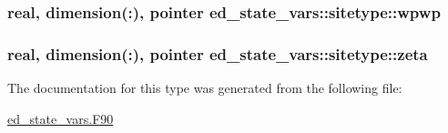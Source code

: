 \subsubsection[{\texorpdfstring{wpwp}{wpwp}}]{\setlength{\rightskip}{0pt plus 5cm}real, dimension(\+:), pointer ed\+\_\+state\+\_\+vars\+::sitetype\+::wpwp}\hypertarget{structed__state__vars_1_1sitetype_a12e100b115852f06fd1d59d2804f5ff8}{}\label{structed__state__vars_1_1sitetype_a12e100b115852f06fd1d59d2804f5ff8}
\subsubsection[{\texorpdfstring{zeta}{zeta}}]{\setlength{\rightskip}{0pt plus 5cm}real, dimension(\+:), pointer ed\+\_\+state\+\_\+vars\+::sitetype\+::zeta}\hypertarget{structed__state__vars_1_1sitetype_a57f9adc9b703699e68b16649712d0120}{}\label{structed__state__vars_1_1sitetype_a57f9adc9b703699e68b16649712d0120}


The documentation for this type was generated from the following file\+:\begin{DoxyCompactItemize}
\item 
\hyperlink{ed__state__vars_8_f90}{ed\+\_\+state\+\_\+vars.\+F90}\end{DoxyCompactItemize}
